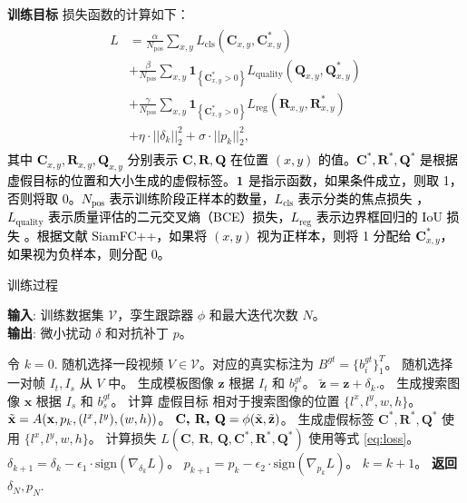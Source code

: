 \textbf{训练目标} 损失函数的计算如下：
\begin{equation}
\begin{array}{l}
\begin{aligned}
L&=\frac{\alpha}{N_{\mathrm{pos}}} \sum_{x, y} L_{\mathrm{cls}}\left(\textbf{C}_{x, y}, \textbf{C}_{x, y}^{*}\right) \\
&+\frac{\beta}{N_{\mathrm{pos}}} \sum_{x, y} \textbf{1}_{\left\{\textbf{C}_{x, y}^{*}>0\right\}} L_{\mathrm{quality}}\left(\textbf{Q}_{x, y}, \textbf{Q}_{x, y}^{*}\right) \\
&+\frac{\gamma}{N_{\mathrm{pos}}} \sum_{x, y} \textbf{1}_{\left\{\textbf{C}_{x, y}^{*}>0\right\}} L_{\mathrm{reg}}\left(\textbf{R}_{x, y}, \textbf{R}_{x, y}^{*}\right) \\
&+\eta \cdot ||\delta_k||_2^2 +  \sigma \cdot ||p_k||^2_2,
\end{aligned}
\end{array}
\label{eq:loss}
\end{equation}
\textcolor{black} %
{其中 $\textbf{C}_{x, y}, \textbf{R}_{x, y}, \textbf{Q}_{x, y}$ 分别表示 $\textbf{C}, \textbf{R}, \textbf{Q}$ 在位置 $(x, y)$ 的值。$\textbf{C}^*, \textbf{R}^*, \textbf{Q}^*$ 是根据虚假目标的位置和大小生成的虚假标签。$\textbf 1$ 是指示函数，如果条件成立，则取 1，否则将取 0。$N_{\mathrm{pos}}$ 表示训练阶段正样本的数量，$L_{\mathrm{cls}}$ 表示分类的焦点损失 \cite{focal}，$L_{\mathrm{quality}}$ 表示质量评估的二元交叉熵（BCE）损失，$L_{\mathrm{reg}}$ 表示边界框回归的 IoU 损失 \cite{iou-loss}。根据文献 SiamFC++，如果将 $(x, y)$ 视为正样本，则将 1 分配给 $\textbf{C}_{x, y}^{*}$，如果视为负样本，则分配 0。}

\begin{algorithm}[tb]
\caption{训练过程}
\label{alg:algorithm}
\textbf{输入}: 训练数据集 $\mathcal{V}$，孪生跟踪器 $\phi$ 和最大迭代次数 $N$。\\
\textbf{输出}: 微小扰动 $\delta$ 和对抗补丁 $p$。
\begin{algorithmic}[1] %
\State 令 $k = 0$.
\State 随机选择一段视频 $V\in \mathcal{V}$。对应的真实标注为 $B^{gt}=\{b^{gt}_i\}^T_1$。
\State 随机选择一对帧 $I_t, I_s$ 从 $V$ 中。
\State 生成模板图像 $\textbf{z}$ 根据 $I_t$ 和 $b^{gt}_t$。
\State $\tilde{\textbf{z}} = \textbf{z} + \delta_k.$。
\State 生成搜索图像 $\textbf{x}$ 根据 $I_s$ 和 $b^{gt}_s$。
\State 计算 虚假目标 相对于搜索图像的位置 $\{l^x, l^y, w, h\}$。
\State $\tilde{\textbf x} = A(\textbf x, p_k, (l^x, l^y), (w, h))$。
\State $\textbf{C, R, Q} = \phi(\tilde {\textbf x}, \tilde{\textbf z})$。
\State 生成虚假标签 $\textbf{C}^*,\textbf{R}^*,\textbf{Q}^*$ 使用 $\{l^x, l^y, w, h\}$。
\State 计算损失 $L(\textbf{C, R, Q}, \textbf{C}^*, \textbf{R}^*, \textbf{Q}^*)$ 使用等式 \ref{eq:loss}。
\State $\delta_{k+1} = \delta_{k} - \epsilon_1 \cdot \text{sign}(\nabla_{\delta_k}L)$。
\State $p_{k+1} = p_{k} - \epsilon_2 \cdot \text{sign}(\nabla_{p_k}L)$。
\State $k = k + 1$。
\EndWhile
\State \textbf{返回} $\delta_N, p_N.$
\end{algorithmic}
\label{alg}
\end{algorithm}

